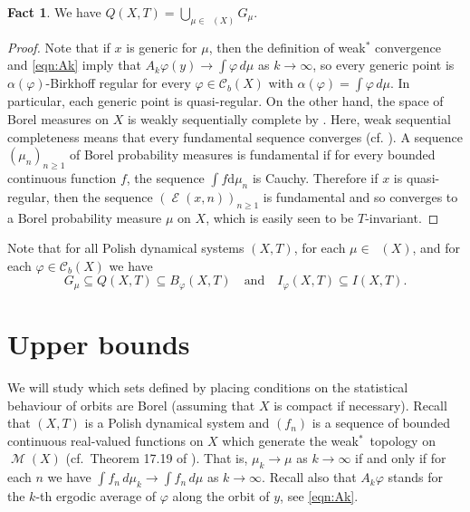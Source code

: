 \documentclass{amsart}
\theoremstyle{definition}
\newtheorem{fact}[thm]{Fact}
\DeclareMathOperator{\Emp}{\mathcal{E}}%
\renewcommand{\phi}{\varphi}
\DeclareMathOperator{\M}{\mathcal{M}}
\DeclareMathOperator{\MT}{\mathcal{M}_{\mathit T} }
\newcommand{\weakst}{weak$^*$}
\newcommand{\R}{\mathbb{R}}
\begin{document}
\begin{fact}\label{fact:Q=G}
We have $Q(X,T)=\bigcup_{\mu \in \MT(X)} G_\mu$.
\end{fact}
\begin{proof}
Note that if $x$ is generic for $\mu$, then the definition of \weakst \! convergence and \eqref{eqn:Ak} imply that
$A_k\phi(y)\to\int\phi\, d \mu$ as $k\to\infty$, so every generic point is $\alpha(\phi)$-Birkhoff regular for
every $\phi\in\mathcal{C}_b(X)$ with $\alpha(\phi)=\int\phi\, d \mu$. In particular, each generic point is quasi-regular.
On the other hand, the space of Borel measures on $X$ is weakly sequentially complete by \cite[Theorem 8.7.1]{Bogachev}.
Here, weak sequential completeness means that every fundamental sequence converges (cf. \cite[Section 8.1]{Bogachev}). A sequence $(\mu_n)_{n\ge 1}$ of Borel probability measures is fundamental if for every bounded continuous function $f$, the sequence $\int f \text{d}\mu_n$ is Cauchy. Therefore if $x$ is quasi-regular, then the sequence $(\Emp(x,n))_{n\ge 1}$ is fundamental and so converges to a Borel probability measure $\mu$ on $X$, which is easily seen to be $T$-invariant.
\end{proof}






Note that for all Polish dynamical systems $(X,T)$,
for each $\mu\in\MT(X)$, and for each $\phi\in\mathcal{C}_b(X)$ we have
\[
G_\mu\subseteq Q(X,T) \subseteq B_\phi(X,T)
\quad\text{and}
\quad
I_\phi(X,T)\subseteq I(X,T).
\]





\section{Upper bounds} \label{sec:ub}
We will study which sets defined by placing conditions on the statistical behaviour of orbits are Borel
(assuming that $X$ is compact if necessary). Recall that $(X,T)$ is a Polish dynamical system and
$(f_n)$ is a sequence of bounded continuous real-valued functions on $X$
which generate the \weakst\ topology on $\M(X)$ (cf.\ Theorem 17.19 of \cite{Kechris}).
That is, $\mu_k \to \mu$ as $k\to\infty$ if and only if for each $n$ we have $\int f_n\, d\mu_k \to \int f_n\, d\mu$ as $k\to\infty$.
Recall also that $A_k\phi$ stands for the $k$-th ergodic average of $\phi$ along the orbit of $y$, see \eqref{eqn:Ak}.
\end{document}
